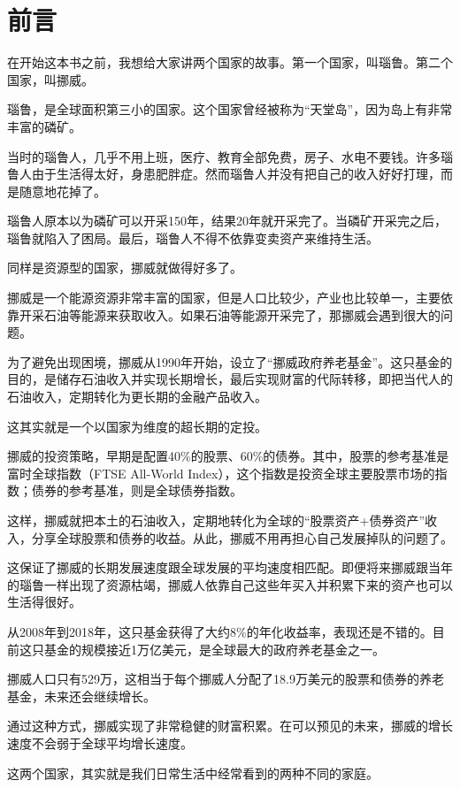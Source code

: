 \section*{前言}
在开始这本书之前，我想给大家讲两个国家的故事。第一个国家，叫瑙鲁。第二个国家，叫挪威。

瑙鲁，是全球面积第三小的国家。这个国家曾经被称为“天堂岛”，因为岛上有非常丰富的磷矿。

当时的瑙鲁人，几乎不用上班，医疗、教育全部免费，房子、水电不要钱。许多瑙鲁人由于生活得太好，身患肥胖症。然而瑙鲁人并没有把自己的收入好好打理，而是随意地花掉了。

瑙鲁人原本以为磷矿可以开采150年，结果20年就开采完了。当磷矿开采完之后，瑙鲁就陷入了困局。最后，瑙鲁人不得不依靠变卖资产来维持生活。

同样是资源型的国家，挪威就做得好多了。

挪威是一个能源资源非常丰富的国家，但是人口比较少，产业也比较单一，主要依靠开采石油等能源来获取收入。如果石油等能源开采完了，那挪威会遇到很大的问题。

为了避免出现困境，挪威从1990年开始，设立了“挪威政府养老基金”。这只基金的目的，是储存石油收入并实现长期增长，最后实现财富的代际转移，即把当代人的石油收入，定期转化为更长期的金融产品收入。

这其实就是一个以国家为维度的超长期的定投。

挪威的投资策略，早期是配置40\%的股票、60\%的债券。其中，股票的参考基准是富时全球指数（FTSE All-World Index），这个指数是投资全球主要股票市场的指数；债券的参考基准，则是全球债券指数。

这样，挪威就把本土的石油收入，定期地转化为全球的“股票资产+债券资产”收入，分享全球股票和债券的收益。从此，挪威不用再担心自己发展掉队的问题了。

这保证了挪威的长期发展速度跟全球发展的平均速度相匹配。即便将来挪威跟当年的瑙鲁一样出现了资源枯竭，挪威人依靠自己这些年买入并积累下来的资产也可以生活得很好。

从2008年到2018年，这只基金获得了大约8\%的年化收益率，表现还是不错的。目前这只基金的规模接近1万亿美元，是全球最大的政府养老基金之一。

挪威人口只有529万，这相当于每个挪威人分配了18.9万美元的股票和债券的养老基金，未来还会继续增长。

通过这种方式，挪威实现了非常稳健的财富积累。在可以预见的未来，挪威的增长速度不会弱于全球平均增长速度。

这两个国家，其实就是我们日常生活中经常看到的两种不同的家庭。

